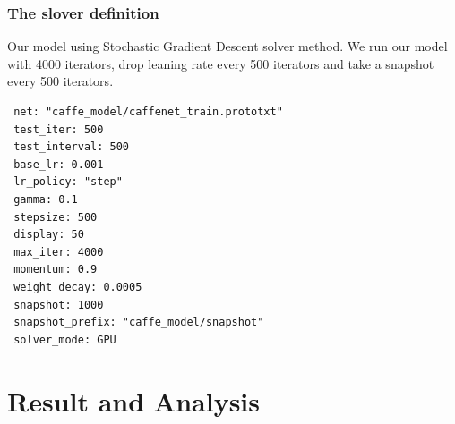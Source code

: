 \documentclass[11pt]{article}
\begin{document}
\subsubsection{The slover definition}
Our model using Stochastic Gradient Descent solver method. We run our model with 4000 iterators, drop leaning rate every 500 iterators and take a snapshot every 500 iterators.
\begin{verbatim}
 net: "caffe_model/caffenet_train.prototxt"
 test_iter: 500
 test_interval: 500
 base_lr: 0.001
 lr_policy: "step"
 gamma: 0.1
 stepsize: 500
 display: 50
 max_iter: 4000
 momentum: 0.9
 weight_decay: 0.0005
 snapshot: 1000
 snapshot_prefix: "caffe_model/snapshot"
 solver_mode: GPU
\end{verbatim}

\section{Result and Analysis}



\end{document}
